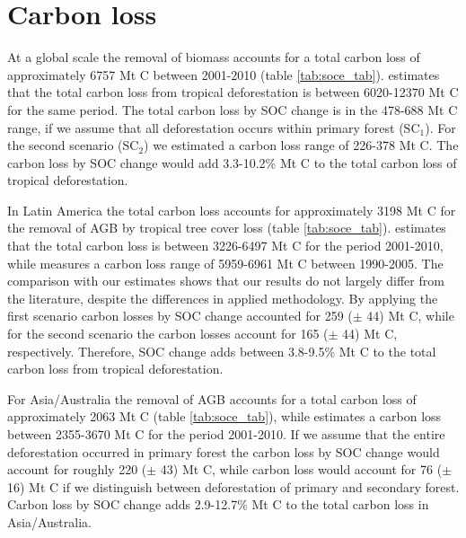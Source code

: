 	\section{Carbon loss}
	\label{sec:results_carbon_loss}
		At a global scale the removal of biomass accounts for a total carbon loss of approximately 6757 Mt C between 2001-2010 (table \ref{tab:soce_tab}). \citet{Achard2014} estimates that the total carbon loss from tropical deforestation is between 6020-12370 Mt C for the same period. The total carbon loss by \ac{SOC} change is in the 478-688 Mt C range, if we assume that all deforestation occurs within primary forest (SC$_1$). For the second scenario (SC$_2$) we estimated a carbon loss range of 226-378 Mt C. The carbon loss by \ac{SOC} change would add 3.3-10.2\% Mt C to the total carbon loss of tropical deforestation.

		In Latin America the total carbon loss accounts for approximately 3198 Mt C for the removal of \ac{AGB} by tropical tree cover loss (table \ref{tab:soce_tab}). \citet{Achard2014} estimates that the total carbon loss is between 3226-6497 Mt C for the period 2001-2010, while \citet{Sy2015} measures a carbon loss range of 5959-6961 Mt C between 1990-2005. The comparison with our estimates shows that our results do not largely differ from the literature, despite the differences in applied methodology. By applying the first scenario carbon losses by \ac{SOC} change accounted for 259 ($\pm$ 44) Mt C, while for the second scenario the carbon losses account for 165 ($\pm$ 44) Mt C, respectively. Therefore, \ac{SOC} change adds between 3.8-9.5\% Mt C to the total carbon loss from tropical deforestation.

		For Asia/Australia the removal of \ac{AGB} accounts for a total carbon loss of approximately 2063 Mt C (table \ref{tab:soce_tab}), while \citet{Achard2014} estimates a carbon loss between 2355-3670 Mt C for the period 2001-2010. If we assume that the entire deforestation occurred in primary forest the carbon loss by \ac{SOC} change would account for roughly 220 ($\pm$ 43) Mt C, while carbon loss would account for 76 ($\pm$ 16) Mt C if we distinguish between deforestation of primary and secondary forest. Carbon loss by \ac{SOC} change adds 2.9-12.7\% Mt C to the total carbon loss in Asia/Australia.

